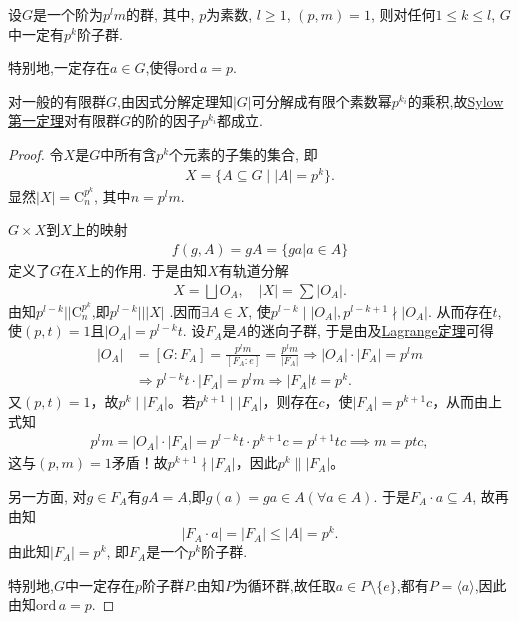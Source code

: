 \documentclass[../../main.tex]{subfiles}%
\begin{document}
\begin{theorem}\label{theorem:Sylow 第一定理}
设$G$是一个阶为$p^lm$的群, 其中, $p$为素数, $l\geqslant 1$, $(p,m)=1$, 则对任何$1\leqslant k\leqslant l$, $G$中一定有$p^k$阶子群.

特别地,一定存在$a\in G$,使得$\mathrm{ord}\,a = p$.
\end{theorem}
\begin{remark}
对一般的有限群$G$,由因式分解定理知$|G|$可分解成有限个素数幂$p^{k_i}$的乘积,故\hyperref[theorem:Sylow 第一定理]{Sylow 第一定理}对有限群$G$的阶的因子$p^{k_i}$都成立.
\end{remark}
\begin{proof}

令$X$是$G$中所有含$p^k$个元素的子集的集合, 即
\begin{align*}
X=\{A\subseteq G\mid |A|=p^k\}.
\end{align*}
显然$|X|=\mathrm{C}_n^{p^k}$, 其中$n=p^lm$.

$G\times X$到$X$上的映射
\begin{align*}
f(g,A)=gA=\{ga|a\in A\}
\end{align*}
定义了$G$在$X$上的作用. 于是由知$X$有轨道分解
\begin{align*}
X=\bigsqcup O_A, \quad |X|=\sum |O_A|.
\end{align*}
由知$p^{l-k}||\mathrm{C}_n^{p^k}$,即$p^{l-k}|||X|$ .因而$\exists A\in X$, 使$p^{l-k}\mid |O_A|,p^{l-k+1}\nmid |O_A|$. 从而存在$t$,使$(p,t)=1$且$|O_A|=p^{l-k}t$.
设$F_A$是$A$的迷向子群, 于是由及\hyperref[theorem:抽象代数--Lagrange定理]{Lagrange定理}可得
\begin{align*}
|O_A|&=[G:F_A]=\frac{p^lm}{[F_A:e]}=\frac{p^lm}{|F_A|}\Longrightarrow |O_A|\cdot |F_A|=p^lm
\\
&\Longrightarrow p^{l-k}t\cdot |F_A|=p^lm\Longrightarrow |F_A|t=p^k.
\end{align*}
又$(p,t)=1$，故$p^k\mid |F_A|$。若$p^{k+1}\mid |F_A|$，则存在$c$，使$|F_A|=p^{k+1}c$，从而由上式知
\begin{align*}
p^lm=|O_A|\cdot |F_A|=p^{l-k}t\cdot p^{k+1}c=p^{l+1}tc\implies m=ptc,
\end{align*}
这与$(p,m)=1$矛盾！故$p^{k+1}\nmid |F_A|$，因此$p^k\parallel |F_A|$。

另一方面, 对$g\in F_A$有$gA=A$,即$g(a)=ga\in A(\forall a\in A)$. 于是$F_A\cdot a\subseteq A$, 故再由知
$$
|F_A\cdot a|=|F_A|\leqslant |A|=p^k.
$$
由此知$|F_A|=p^k$, 即$F_A$是一个$p^k$阶子群.

特别地,$G$中一定存在$p$阶子群$P$.由知$P$为循环群,故任取$a\in P\setminus\{e\}$,都有$P = \langle a \rangle$,因此由知$\mathrm{ord}\,a = p$.

\end{proof}
\end{document}
